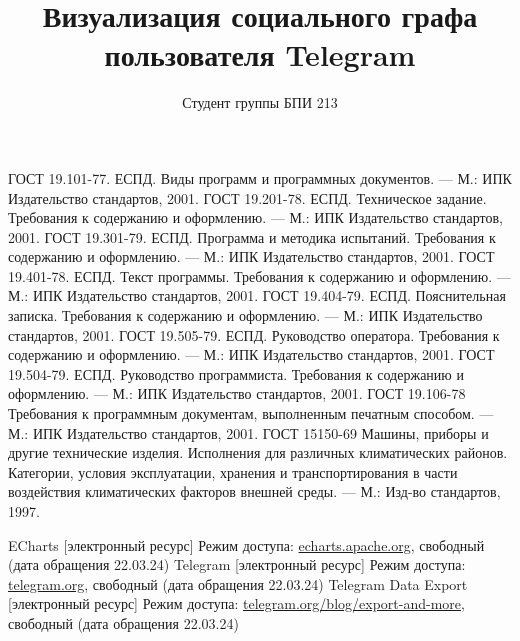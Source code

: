 \documentclass{TechDoc}
\title{Визуализация социального графа пользователя Telegram}
\author{Студент группы БПИ 213}{Н. А. Бирюлин}
\begin{document}
    \maketitle
    
    \tableofcontents

    

    

    

    

    

    \begin{thebibliography}{9}
         ГОСТ 19.101-77. ЕСПД. Виды программ и программных документов. --- М.: ИПК Издательство стандартов, 2001.
         ГОСТ 19.201-78. ЕСПД. Техническое задание. Требования к содержанию и оформлению. --- М.: ИПК Издательство стандартов, 2001.
         ГОСТ 19.301-79. ЕСПД. Программа и методика испытаний. Требования к содержанию и оформлению. --- М.: ИПК Издательство стандартов, 2001.
         ГОСТ 19.401-78. ЕСПД. Текст программы. Требования к содержанию и оформлению. --- М.: ИПК Издательство стандартов, 2001.
         ГОСТ 19.404-79. ЕСПД. Пояснительная записка. Требования к содержанию и оформлению. --- М.: ИПК Издательство стандартов, 2001.
         ГОСТ 19.505-79. ЕСПД. Руководство оператора. Требования к содержанию и оформлению. --- М.: ИПК Издательство стандартов, 2001.
         ГОСТ 19.504-79. ЕСПД. Руководство программиста. Требования к содержанию и оформлению. --- М.: ИПК Издательство стандартов, 2001.
         ГОСТ 19.106-78 Требования к программным документам, выполненным печатным способом. --- М.: ИПК Издательство стандартов, 2001.
         ГОСТ 15150-69 Машины, приборы и другие технические изделия. Исполнения для различных климатических районов. Категории, условия эксплуатации, хранения и транспортирования в части воздействия климатических факторов внешней среды. --- М.: Изд-во стандартов, 1997.

         ECharts [электронный ресурс] Режим доступа: \href{https://echarts.apache.org}{echarts.apache.org}, свободный (дата обращения 22.03.24)
         Telegram [электронный ресурс] Режим доступа: \href{https://telegram.org}{telegram.org}, свободный (дата обращения 22.03.24)
         Telegram Data Export [электронный ресурс] Режим доступа: \href{https://telegram.org/blog/export-and-more}{telegram.org/blog/export-and-more}, свободный (дата обращения 22.03.24)
    \end{thebibliography}

    \registrationList
        
\end{document}

